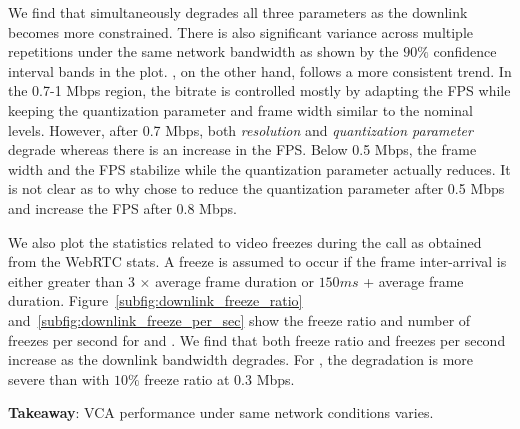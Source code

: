 We find that \teamsbrowser simultaneously degrades all three parameters as the downlink becomes more constrained. There is also significant variance across multiple repetitions under the same network bandwidth as shown by the $90\%$ confidence interval bands in the plot. \meet, on the other hand, follows a more consistent trend. In the 0.7-1 Mbps region, the bitrate is controlled mostly by adapting the FPS while keeping the quantization parameter and frame width similar to the nominal levels. However, after 0.7 Mbps, both \textit{resolution} and \textit{quantization parameter} degrade whereas there is an increase in the FPS. Below 0.5 Mbps, the frame width and the FPS stabilize while the quantization parameter actually reduces. It is not clear as to why \meet chose to reduce the quantization parameter after 0.5 Mbps and increase the FPS after 0.8 Mbps. 

We also plot the statistics related to video freezes during the call as obtained from the WebRTC stats. A freeze is assumed to occur if the frame inter-arrival is either greater than 3 $\times$ average frame duration or $150 ms$ + average frame duration.  Figure~\ref{subfig:downlink_freeze_ratio} and~\ref{subfig:downlink_freeze_per_sec} show the freeze ratio and number of freezes per second for \meet and \teamsbrowser. We find that both freeze ratio and freezes per second increase as the downlink bandwidth degrades. For \meet, the degradation is more severe than \teamsbrowser with $10\%$ freeze ratio at 0.3 Mbps. 





\textbf{Takeaway}: VCA performance under same network conditions varies.  








